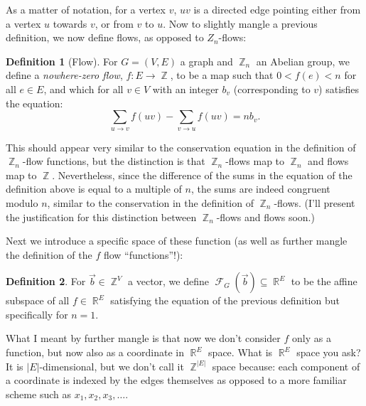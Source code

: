 \documentclass{amsart}
\DeclareMathOperator{\Z}{\mathbb{Z}}
\DeclareMathOperator{\R}{\mathbb{R}}
\DeclareMathOperator{\calF}{\mathcal{F}}
\theoremstyle{plain}
\theoremstyle{remark}
\theoremstyle{definition}
\newtheorem*{definition*}{Definition}
\newenvironment{definition}%
	{\begin{leftbar}\begin{definition*}
}{%
	\end{definition*}\end{leftbar}
}
\begin{document}
As a matter of notation, for a vertex $v$, $uv$ is a directed edge pointing
either from a vertex $u$ towards $v$, or from $v$ to $u$. Now to slightly mangle
a previous definition, we now define flows, as opposed to $Z_n$-flows:
\begin{definition}[Flow]
  For $G=(V,E)$ a graph and $\Z_n$ an Abelian group, we define a
  \emph{nowhere-zero flow}, $f:E\to\Z$, to be a map such that $0<f(e)<n$ for all
  $e\in E$, and which for all $v\in V$ with an integer $b_v$ (corresponding to
  $v$) satisfies the equation:
  \[
    \sum_{u\to v}f(uv)-\sum_{v\to u}f(uv)=nb_v.
  \] 
\end{definition}
This should appear very similar to the conservation equation in the
definition of $\Z_n$-flow functions,
but the distinction is that $\Z_n$-flows map to $\Z_n$ and flows map to $\Z$.
Nevertheless, since the difference of the sums in the equation of the definition
above is equal to a multiple of $n$, the sums are indeed congruent modulo $n$,
similar to the conservation in the definition of $\Z_n$-flows.
(I'll present the justification for this distinction between $\Z_n$-flows and
flows soon.)

Next we introduce a specific space of these function
(as well as further mangle the definition of the $f$ flow ``functions''!):
\begin{definition}
  For $\vec b\in\Z^V$ a vector, we define $\calF_G(\vec b)\subseteq\R^E$ to be
  the affine subspace of all $f\in\R^E$ satisfying the equation of the previous
  definition but specifically for $n=1$.
\end{definition}
What I meant by further mangle is that now we don't consider $f$ only as
a function, but now also as a coordinate in $\R^E$ space.
What is $\R^E$ space you ask?
It is ${\lvert E\rvert}$-dimensional, but we don't call it $\Z^{\lvert E\rvert}$
space because: each component of a coordinate is indexed by the edges themselves
as opposed to a more familiar scheme such as $x_1,x_2,x_3,\ldots$.
\end{document}
